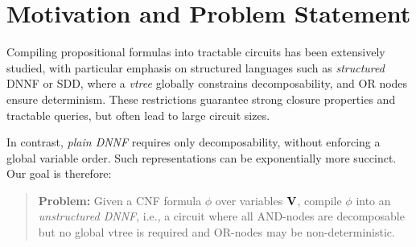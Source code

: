 
\section{Motivation and Problem Statement}
%
Compiling propositional formulas into tractable circuits has been extensively studied,
with particular emphasis on structured languages such as \emph{structured} DNNF or SDD,
where a \emph{vtree} globally constrains decomposability, and OR nodes
ensure determinism. These restrictions guarantee strong closure properties and
tractable queries, but often lead to large circuit sizes.

In contrast, \emph{plain DNNF} requires only decomposability,
without enforcing a global variable order.
Such representations can be exponentially more succinct.
Our goal is therefore:

\begin{quote}
\textbf{Problem:} Given a CNF formula $\phi$ over variables $\mathbf{V}$,
compile $\phi$ into an \emph{unstructured DNNF}, i.e.,
a circuit where all AND-nodes are decomposable but
no global vtree is required and OR-nodes may be non-deterministic.
\end{quote}


